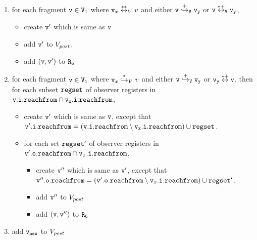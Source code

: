 \begin{itemize}
\begin{enumerate}
\item for each fragment $\tt v \in V_1$ where $\mathtt{v}_x \overset{**}\leftrightarrow_{V} v$ and either $\tt v \overset{+}\hookrightarrow_{V} \mathtt{v}_y$ or $\tt v \overset{*+}\leftrightarrow_{V} \mathtt{v}_y$, 
\begin{itemize}
\item create $\tt v'$ which is same as $\tt v$
\item  add $\tt v'$ to $V_{post}$,
\item add $\tt (v,v')$ to $\tt R_5$

\end{itemize}


\item for each fragment $\tt v \in V_1$ where $\mathtt{v}_x \overset{*}\hookrightarrow_{V} v$ and either $\tt v \overset{+}\hookrightarrow_{V} \mathtt{v}_y$ or $\tt \mathtt{v}_y \overset{*+}\leftrightarrow v$, then for each subset $\mathtt{regset}$ of observer registers in $\tt \mathtt{v}.\mathtt{i}.\mathtt{reachfrom} \cap \mathtt{v}_x.\mathtt{i}.\mathtt{reachfrom}$, 
\begin{itemize}
\item create $\tt v'$ which is same as $\tt v$, except that $\mathtt{v}'.\mathtt{i}.\mathtt{reachfrom} = (\tt \mathtt{v}.\mathtt{i}.\mathtt{reachfrom} \setminus \mathtt{v}_x.\mathtt{i}.\mathtt{reachfrom}) \cup \mathtt{regset}$. 
 \item for each set $\mathtt{regset}'$ of observer registers in $\mathtt{v}'.\mathtt{o}.\mathtt{reachfrom} \cap \mathtt{v}_x.\mathtt{i}.\mathtt{reachfrom}$,  
\begin{itemize}
\item create $\mathtt{v}''$ which is same as $\mathtt{v}'$, except that $\mathtt{v}''.\mathtt{o}.\mathtt{reachfrom} = (\mathtt{v}'.\mathtt{o}.\mathtt{reachfrom} \setminus \mathtt{v}_x.\mathtt{i}.\mathtt{reachfrom}) \cup \mathtt{regset}'$. 
\item add $\mathtt{v}''$ to $V_{post}$
\item add $\tt (v,v'')$ to $\tt R_6$
\end{itemize}
\end{itemize}
\item add $\tt \mathtt{v}_{new}$ to $V_{post}$ 
\end{enumerate}


\end{itemize}
